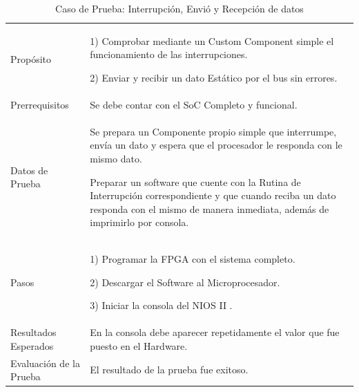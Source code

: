 \begin{table}
	\begin{tabular}{|>{\columncolor[gray]{0.8}}l|p{11cm}|} \hline
\multicolumn{2}{|>{\columncolor[gray]{0.8}}l|}{\textbf{Caso de Prueba: Interrupción, Envió y Recepción de datos}}\\ \hline
Propósito  & 1) Comprobar mediante un Custom Component simple el funcionamiento de las interrupciones.

2) Enviar y recibir un dato Estático por el bus sin errores. 
\\ \hline
 Prerrequisitos  & Se debe contar con el SoC Completo y funcional.\\ \hline
 Datos de Prueba & Se prepara un Componente propio simple que interrumpe, envía un dato y espera que el procesador le responda con le mismo dato. 

Preparar un software que cuente con la Rutina de Interrupción correspondiente y que cuando reciba un dato responda con el mismo de manera inmediata, además de imprimirlo por consola.
 \\ \hline
 Pasos & 1) Programar la FPGA con el sistema completo.

2) Descargar el Software al Microprocesador.

3) Iniciar la consola del NIOS II .
\\ \hline
 Resultados Esperados & En la consola debe aparecer repetidamente el valor que fue puesto en el Hardware. \\ \hline
 Evaluación de la Prueba  & El resultado de la prueba fue exitoso.\\ \hline
	\end{tabular}
	\caption{Caso de Prueba: Interrupción, Envió y Recepción de datos}
	\label{tab:enviorecepcion}
\end{table}
